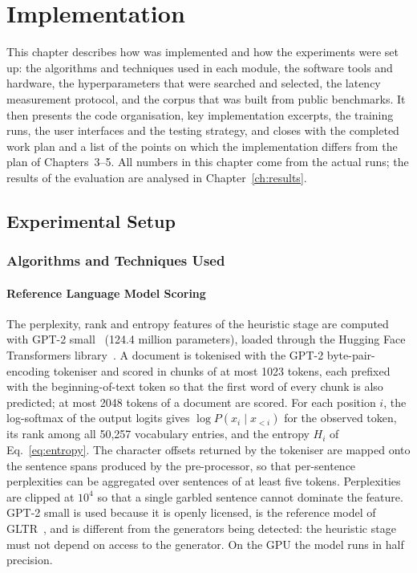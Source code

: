 \chapter{Implementation}
\label{ch:impl}

This chapter describes how \veriscript{} was implemented and how the
experiments were set up: the algorithms and techniques used in each module,
the software tools and hardware, the hyperparameters that were searched and
selected, the latency measurement protocol, and the corpus that was built from
public benchmarks. It then presents the code organisation, key implementation
excerpts, the training runs, the user interfaces and the testing strategy, and
closes with the completed work plan and a list of the points on which the
implementation differs from the plan of Chapters~3--5. All numbers in this
chapter come from the actual runs; the results of the evaluation are analysed
in Chapter~\ref{ch:results}.

\section{Experimental Setup}

\subsection{Algorithms and Techniques Used}

\subsubsection{Reference Language Model Scoring}

The perplexity, rank and entropy features of the heuristic stage are
computed with GPT-2 small~\cite{radford2019language} (124.4 million
parameters), loaded through the Hugging Face Transformers
library~\cite{wolf2020transformers}. A document is tokenised with the GPT-2
byte-pair-encoding tokeniser and scored in chunks of at most 1023 tokens, each
prefixed with the beginning-of-text token so that the first word of every
chunk is also predicted; at most 2048 tokens of a document are scored. For
each position $i$, the log-softmax of the output logits gives
$\log P(x_i \mid x_{<i})$ for the observed token, its rank among all 50,257
vocabulary entries, and the entropy $H_i$ of Eq.~\eqref{eq:entropy}. The
character offsets returned by the tokeniser are mapped onto the sentence spans
produced by the pre-processor, so that per-sentence perplexities can be
aggregated over sentences of at least five tokens. Perplexities are clipped at
$10^4$ so that a single garbled sentence cannot dominate the feature. GPT-2
small is used because it is openly licensed, is the reference model of
GLTR~\cite{gehrmann2019gltr}, and is different from the generators being
detected: the heuristic stage must not depend on access to the generator. On
the GPU the model runs in half precision.

